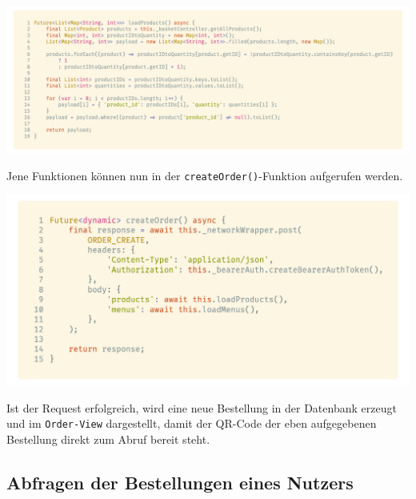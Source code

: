 \begin{code}
    \centering
    \includegraphics[width=1\textwidth]{images/Client/services/manage-orders/createProductPayload.png}
    \vspace{-25pt}
    \caption{\lstinline{loadProducts()}-Funktion zum Laden bestellter Produkte in den Request-Body}
\end{code}

\newpage

Jene Funktionen können nun in der \lstinline{createOrder()}-Funktion aufgerufen werden.

\begin{code}
    \centering
    \includegraphics[width=1\textwidth]{images/Client/services/manage-orders/createOrder.png}
    \vspace{-25pt}
    \caption{\lstinline{loadProducts()}-Funktion zum Laden bestellter Produkte in den Request-Body}
\end{code}

Ist der Request erfolgreich, wird eine neue Bestellung in der Datenbank erzeugt und im 
\lstinline{Order-View} dargestellt, damit der QR-Code der eben aufgegebenen Bestellung
direkt zum Abruf bereit steht.

\newpage

\subsection{Abfragen der Bestellungen eines Nutzers}

